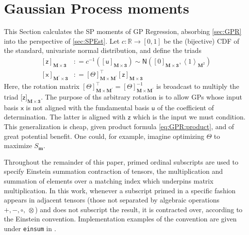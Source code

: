\documentclass[preprint,12pt]{elsarticle}
\newcommand*{\M}[1]{\ensuremath{#1}\xspace}
\newcommand*{\x}{\times}
\newcommand*{\mi}[1]{\mathbf{#1}}
\newcommand*{\st}[1]{\mathbb{#1}}
\newcommand*{\rv}[1]{\mathsf{#1}}
\newcommand*{\te}[2][]{\left\lbrack{#2}\right\rbrack_{#1}}
\newcommand*{\tte}[2][]{\lbrack{#2}\rbrack_{#1}}
\newcommand*{\diag}[2][]{\left\langle{#2}\right\rangle_{#1}}
\newcommand*{\deq}{\M{\mathrel{\mathop:}=}}
\newcommand*{\gauss}[2]{\mathsf{N}\!\left({#1,#2}\right)}
\begin{document}
\section{Gaussian Process moments}\label{sec:GPMom}
    This Section calculates the SP moments of GP Regression, absorbing \cref{sec:GPR} into the perspective of \cref{sec:SPEst}.
    Let $c\colon \st{R} \to [0,1]$ be the (bijective) CDF of the standard, univariate normal distribution, and define the triads
    \begin{equation*}
        \begin{aligned}
            \te[\mi{M\x 3}]{\rv{z}} &\deq c^{-1}\!\left(\te[\mi{M\x 3}]
            {\rv{u}}\right) \sim \gauss{\te[\mi{M\x 3}]{0}}{\diag[\mi{M}^{2}]{1}} \\
            \te[\mi{M^{\prime}\x 3}]{\rv{x}} &\deq \te[\mi{M\x M^{\prime}}]{\Theta}^{\intercal} \te[\mi{M\x 3}]{\rv{z}}
        \end{aligned}
    \end{equation*}
    Here, the rotation matrix $\te[\mi{M\x M^{\prime}}]{\Theta}^{\intercal} = \te[\mi{M\x M^{\prime}}]{\Theta}^{-1}$ is broadcast to multiply the triad $\tte[\mi{M\x 3}]{\rv{z}}$. 
    The purpose of ths arbitrary rotation is to allow GPs whose input basis $\rv{x}$ is not aligned with the fundamental basis $\rv{u}$ of the coefficient of determination. The latter is aligned with $\rv{z}$ which is the input we must condition. This generalization is cheap, given product formula \cref{eq:GPR:product}, and of great potential benefit. One could, for example, imagine optimizing $\Theta$ to maximize $S_{\mi{m}}$.
    
    Throughout the remainder of this paper, primed ordinal subscripts are used to specify Einstein summation contraction of tensors, the multiplication and summation of elements over a matching index which underpins matrix multiplication. In this work, whenever a subscript primed in a specific fashion appears in adjacent tensors (those not separated by algebraic operations $+,-,\circ,\,\otimes$) and does not subscript the result, it is contracted over, according to the Einstein convention. Implementation examples of the convention are given under {\tt einsum} in \cite{Numpy2022}.
    
\end{document}
